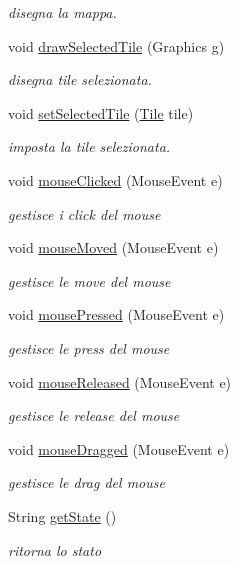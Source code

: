 \begin{DoxyCompactItemize}
\begin{DoxyCompactList}\small\item\em disegna la mappa. \end{DoxyCompactList}\item 
void \hyperlink{classscenes_1_1_editing_aa0f35d91a41dfb53af7bdd7d4a76916f}{draw\+Selected\+Tile} (Graphics g)
\begin{DoxyCompactList}\small\item\em disegna tile selezionata. \end{DoxyCompactList}\item 
void \hyperlink{classscenes_1_1_editing_adaa2adb9d249f9b235fb9bb96aed4924}{set\+Selected\+Tile} (\hyperlink{classobjects_1_1_tile}{Tile} tile)
\begin{DoxyCompactList}\small\item\em imposta la tile selezionata. \end{DoxyCompactList}\item 
void \hyperlink{classscenes_1_1_editing_a45d56bd84238e8b56589dfc732e2b2cf}{mouse\+Clicked} (Mouse\+Event e)
\begin{DoxyCompactList}\small\item\em gestisce i click del mouse \end{DoxyCompactList}\item 
void \hyperlink{classscenes_1_1_editing_a2ca251710b65639ec80bc141edde60aa}{mouse\+Moved} (Mouse\+Event e)
\begin{DoxyCompactList}\small\item\em gestisce le move del mouse \end{DoxyCompactList}\item 
void \hyperlink{classscenes_1_1_editing_aed82e1ce3dd3cf283d508c3ba3be70ef}{mouse\+Pressed} (Mouse\+Event e)
\begin{DoxyCompactList}\small\item\em gestisce le press del mouse \end{DoxyCompactList}\item 
void \hyperlink{classscenes_1_1_editing_a87a07291794e15052db67f945d90853e}{mouse\+Released} (Mouse\+Event e)
\begin{DoxyCompactList}\small\item\em gestisce le release del mouse \end{DoxyCompactList}\item 
void \hyperlink{classscenes_1_1_editing_adbfc0588c017133c9b7070474402b72f}{mouse\+Dragged} (Mouse\+Event e)
\begin{DoxyCompactList}\small\item\em gestisce le drag del mouse \end{DoxyCompactList}\item 
String \hyperlink{classscenes_1_1_editing_ae514afc7c85c1cee14d2862a8b0e07b3}{get\+State} ()
\begin{DoxyCompactList}\small\item\em ritorna lo stato \end{DoxyCompactList}\end{DoxyCompactItemize}
